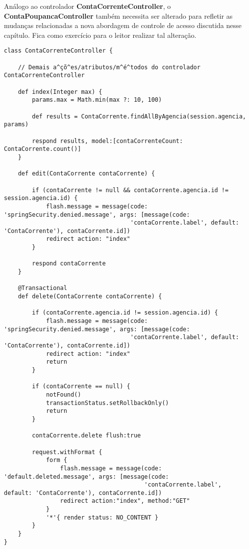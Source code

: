 \vspace{0.5cm}

\begin{remark}
Análogo    ao     controlador    {\bf    ContaCorrenteController},     o    {\bf
  ContaPoupancaController}  também  necessita  ser  alterado  para  refletir  as
mudanças relacionadas  a nova  abordagem de controle  de acesso  discutida nesse
capítulo. Fica como exercício para o leitor realizar tal alteração. 
\end{remark}

\newpage

\begin{lstlisting}[caption=Controlador       {\bf      ContaCorrenteController},
    frame=trBL, float=htbp, label=codContaCorrenteController] 
class ContaCorrenteController {

    // Demais a^çõ^es/atributos/m^é^todos do controlador ContaCorrenteController

    def index(Integer max) {
        params.max = Math.min(max ?: 10, 100)        

        def results = ContaCorrente.findAllByAgencia(session.agencia, params)

        respond results, model:[contaCorrenteCount: ContaCorrente.count()]
    }

    def edit(ContaCorrente contaCorrente) {
        
        if (contaCorrente != null && contaCorrente.agencia.id != session.agencia.id) {
            flash.message = message(code: 'springSecurity.denied.message', args: [message(code: 
                                    'contaCorrente.label', default: 'ContaCorrente'), contaCorrente.id])
            redirect action: "index"
        }

        respond contaCorrente
    }

    @Transactional
    def delete(ContaCorrente contaCorrente) {
        
        if (contaCorrente.agencia.id != session.agencia.id) {
            flash.message = message(code: 'springSecurity.denied.message', args: [message(code: 
                                    'contaCorrente.label', default: 'ContaCorrente'), contaCorrente.id])
            redirect action: "index"
            return
        }

        if (contaCorrente == null) {
            notFound()
            transactionStatus.setRollbackOnly()
            return
        }

        contaCorrente.delete flush:true

        request.withFormat {
            form {
                flash.message = message(code: 'default.deleted.message', args: [message(code: 
                                        'contaCorrente.label', default: 'ContaCorrente'), contaCorrente.id])
                redirect action:"index", method:"GET"
            }
            '*'{ render status: NO_CONTENT }
        }
    }
}
\end{lstlisting}

